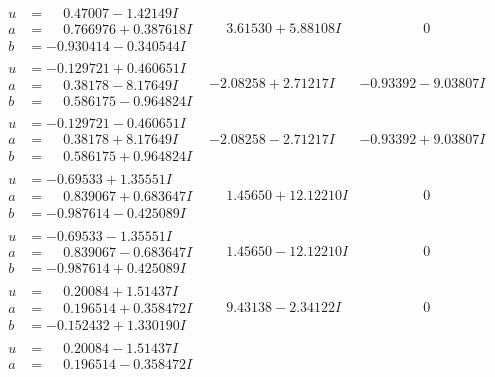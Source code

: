 \documentclass[1p]{elsarticle_modified}
\theoremstyle{definition}
\begin{document}
$$\begin{array}{c|c|c}
 \hline 
\begin{aligned}
u &= \phantom{-}0.47007 - 1.42149 I \\
a &= \phantom{-}0.766976 + 0.387618 I \\
b &= -0.930414 - 0.340544 I\end{aligned}
 & \phantom{-}3.61530 + 5.88108 I & \phantom{-0.000000 } 0 \\ \hline\begin{aligned}
u &= -0.129721 + 0.460651 I \\
a &= \phantom{-}0.38178 - 8.17649 I \\
b &= \phantom{-}0.586175 - 0.964824 I\end{aligned}
 & -2.08258 + 2.71217 I & -0.93392 - 9.03807 I \\ \hline\begin{aligned}
u &= -0.129721 - 0.460651 I \\
a &= \phantom{-}0.38178 + 8.17649 I \\
b &= \phantom{-}0.586175 + 0.964824 I\end{aligned}
 & -2.08258 - 2.71217 I & -0.93392 + 9.03807 I \\ \hline\begin{aligned}
u &= -0.69533 + 1.35551 I \\
a &= \phantom{-}0.839067 + 0.683647 I \\
b &= -0.987614 - 0.425089 I\end{aligned}
 & \phantom{-}1.45650 + 12.12210 I & \phantom{-0.000000 } 0 \\ \hline\begin{aligned}
u &= -0.69533 - 1.35551 I \\
a &= \phantom{-}0.839067 - 0.683647 I \\
b &= -0.987614 + 0.425089 I\end{aligned}
 & \phantom{-}1.45650 - 12.12210 I & \phantom{-0.000000 } 0 \\ \hline\begin{aligned}
u &= \phantom{-}0.20084 + 1.51437 I \\
a &= \phantom{-}0.196514 + 0.358472 I \\
b &= -0.152432 + 1.330190 I\end{aligned}
 & \phantom{-}9.43138 - 2.34122 I & \phantom{-0.000000 } 0 \\ \hline\begin{aligned}
u &= \phantom{-}0.20084 - 1.51437 I \\
a &= \phantom{-}0.196514 - 0.358472 I \\

\end{aligned}
\end{array}$$
\end{document}
